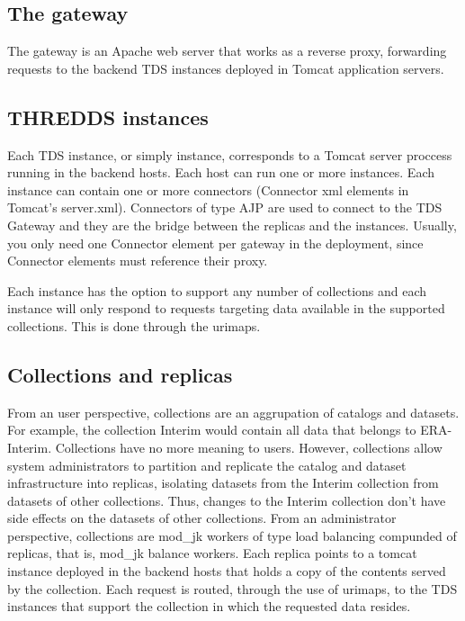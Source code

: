 \documentclass[a4paper,12pt]{article}
\begin{document}
\subsection{The gateway}

The gateway is an Apache web server that works as a reverse proxy, forwarding requests to the backend TDS instances deployed in Tomcat application servers.

\subsection{THREDDS instances}

Each TDS instance, or simply instance, corresponds to a Tomcat server proccess running in the backend hosts. Each host can run one or more instances. Each instance can contain one or more connectors (Connector xml elements in Tomcat's server.xml). Connectors of type AJP are used to connect to the TDS Gateway and they are the bridge between the replicas and the instances. Usually, you only need one Connector element per gateway in the deployment, since Connector elements must reference their proxy.  

Each instance has the option to support any number of collections and each instance will only respond to requests targeting data available in the supported collections. This is done through the urimaps.

\subsection{Collections and replicas}

From an user perspective, collections are an aggrupation of catalogs and datasets. For example, the collection Interim would contain all data that belongs to ERA-Interim. Collections have no more meaning to users. However, collections allow system administrators to partition and replicate the catalog and dataset infrastructure into replicas, isolating datasets from the Interim collection from datasets of other collections. Thus, changes to the Interim collection don't have side effects on the datasets of other collections. 
From an administrator perspective, collections are mod\_jk workers of type load balancing compunded of replicas, that is, mod\_jk balance workers. Each replica points to a tomcat instance deployed in the backend hosts that holds a copy of the contents served by the collection. Each request is routed, through the use of urimaps, to the TDS instances that support the collection in which the requested data resides.
\end{document}
